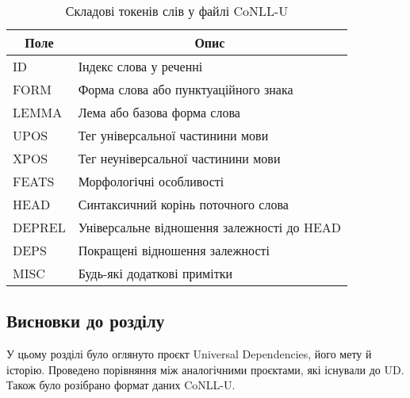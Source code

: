 \begin{table}[ht]
\caption{Складові токенів слів у файлі CoNLL-U}
\label{table:conllu}
\centering
\begin{tabular}{|l|l|}
\hline
\multicolumn{1}{|c|}{Поле} & \multicolumn{1}{|c|}{Опис} \\ \hline
  
ID        & Індекс слова у реченні \\ \hline
FORM      & Форма слова або пунктуаційного знака \\ \hline
LEMMA     & Лема або базова форма слова \\ \hline
UPOS      & Тег універсальної частинини мови \\ \hline
XPOS      & Тег неуніверсальної частинини мови \\ \hline
FEATS     & Морфологічні особливості \\ \hline
HEAD      & Синтаксичний корінь поточного слова \\ \hline
DEPREL    & Універсальне відношення залежності до HEAD \\ \hline
DEPS      & Покращені відношення залежності \\ \hline
MISC      & Будь-які додаткові примітки \\ \hline
\end{tabular}
\end{table}

\subsection*{Висновки до розділу }
У цьому розділі було оглянуто проєкт Universal Dependencies, його мету й
історію. Проведено порівняння між аналогічними проєктами, які існували до UD.
Також було розібрано формат даних CoNLL\nobreakdash-U.
